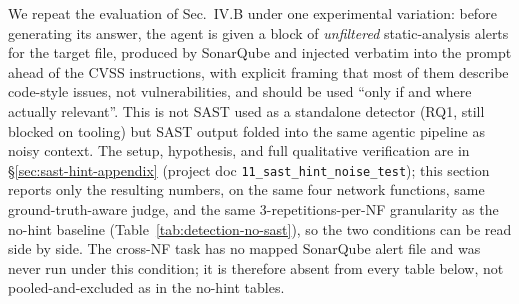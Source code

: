 
We repeat the evaluation of Sec.~IV.B under one experimental variation:
before generating its answer, the agent is given a block of
\emph{unfiltered} static-analysis alerts for the target file, produced by
SonarQube and injected verbatim into the prompt ahead of the CVSS
instructions, with explicit framing that most of them describe code-style
issues, not vulnerabilities, and should be used ``only if and where
actually relevant''. This is not SAST used as a standalone detector (RQ1,
still blocked on tooling) but SAST output folded into the same agentic
pipeline as noisy context. The setup, hypothesis, and full qualitative
verification are in \S\ref{sec:sast-hint-appendix} (project doc
\texttt{11\_sast\_hint\_noise\_test}); this section reports only the
resulting numbers, on the same four network functions, same
ground-truth-aware judge, and the same 3-repetitions-per-NF granularity as
the no-hint baseline (Table~\ref{tab:detection-no-sast}), so the two
conditions can be read side by side. The cross-NF task has no mapped
SonarQube alert file and was never run under this condition; it is
therefore absent from every table below, not pooled-and-excluded as in the
no-hint tables.

